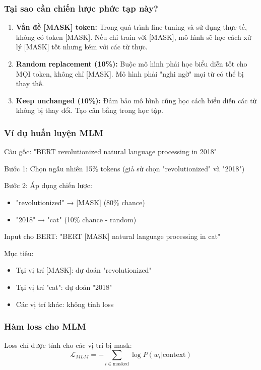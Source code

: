 \subsubsection{Tại sao cần chiến lược phức tạp này?}
\begin{enumerate}
    \item \textbf{Vấn đề [MASK] token:} Trong quá trình fine-tuning và sử dụng thực tế, không có token [MASK]. Nếu chỉ train với [MASK], mô hình sẽ học cách xử lý [MASK] tốt nhưng kém với các từ thực.
    
    \item \textbf{Random replacement (10\%):} Buộc mô hình phải học biểu diễn tốt cho MỌI token, không chỉ [MASK]. Mô hình phải "nghi ngờ" mọi từ có thể bị thay thế.
    
    \item \textbf{Keep unchanged (10\%):} Đảm bảo mô hình cũng học cách biểu diễn các từ không bị thay đổi. Tạo cân bằng trong học tập.
\end{enumerate}

\subsubsection{Ví dụ huấn luyện MLM}
Câu gốc: "BERT revolutionized natural language processing in 2018"

Bước 1: Chọn ngẫu nhiên 15\% tokens (giả sử chọn "revolutionized" và "2018")

Bước 2: Áp dụng chiến lược:
\begin{itemize}
    \item "revolutionized" → [MASK] (80\% chance)
    \item "2018" → "cat" (10\% chance - random)
\end{itemize}

Input cho BERT: "BERT [MASK] natural language processing in cat"

Mục tiêu: 
\begin{itemize}
    \item Tại vị trí [MASK]: dự đoán "revolutionized"
    \item Tại vị trí "cat": dự đoán "2018"
    \item Các vị trí khác: không tính loss
\end{itemize}

\subsubsection{Hàm loss cho MLM}
Loss chỉ được tính cho các vị trí bị mask:
$$ \mathcal{L}_{MLM} = -\sum_{i \in \text{masked}} \log P(w_i | \text{context}) $$

